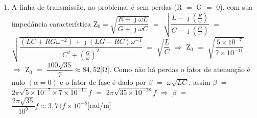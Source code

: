 \begin{enumerate}[1.]
\item A linha de transmissão, no problema, é sem perdas (R $=$ G $=$ $0$), com sua impedância característica Z$_{0} = \sqrt{\dfrac{R + \jmath \omega L}{G + \jmath \omega C}}$ $=$ $\sqrt{\dfrac{L - \jmath \left(\frac{R}{\omega}\right)}{C - \jmath \left(\frac{G}{\omega}\right)}}$ $=$ $\sqrt{\dfrac{(LC + RG\omega^{-2}) + \jmath (LG - RC)\omega^{-1}}{C^{2} + \left(\frac{G}{\omega}\right)^{2}}}$ $=$ $\sqrt{\dfrac{L}{C}}$ $\Rightarrow$ Z$_{0}$ $=$ $\sqrt{\dfrac{5 \times 10^{-7}}{7 \times 10^{-11}}}$ $\Rightarrow$ Z$_{0}$ $=$ $\dfrac{100\sqrt{35}}{7} \approx 84,52$[\si{\ohm}]. Como não há perdas o fator de atenuação é nulo $(\alpha = 0)$ e o fator de fase é dado por $\beta$ $=$ $\omega\sqrt{LC}$, assim $\beta$ $=$ $2\pi\sqrt{5 \times 10^{-7} \times 7 \times 10^{-11}}f$ $=$ $2\pi\sqrt{35 \times 10^{-18}}f$ $\Rightarrow$ $\beta$ $=$ $\dfrac{2\pi\sqrt{35}}{10^{9}}f \approx 3,71f \times 10^{-8}$[\si{\radian/\meter}]


\end{enumerate}
